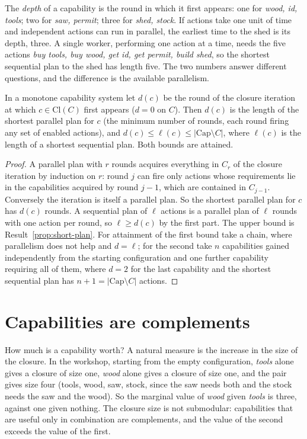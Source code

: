 The \emph{depth} of a capability is the round in which it first appears: one for \emph{wood, id, tools}; two for \emph{saw, permit}; three for \emph{shed, stock}. If actions take one unit of time and independent actions can run in parallel, the earliest time to the shed is its depth, three. A single worker, performing one action at a time, needs the five actions \emph{buy tools, buy wood, get id, get permit, build shed}, so the shortest sequential plan to the shed has length five. The two numbers answer different questions, and the difference is the available parallelism.

\begin{newresult}\label{prop:depth}
In a monotone capability system let $d(c)$ be the round of the closure iteration at which $c\in\mathrm{Cl}(C)$ first appears ($d=0$ on $C$). Then $d(c)$ is the length of the shortest parallel plan for $c$ (the minimum number of rounds, each round firing any set of enabled actions), and $d(c)\le\ell(c)\le|\mathrm{Cap}\setminus C|$, where $\ell(c)$ is the length of a shortest sequential plan. Both bounds are attained.
\end{newresult}
\begin{proof}
A parallel plan with $r$ rounds acquires everything in $C_r$ of the closure iteration by induction on $r$: round $j$ can fire only actions whose requirements lie in the capabilities acquired by round $j-1$, which are contained in $C_{j-1}$. Conversely the iteration is itself a parallel plan. So the shortest parallel plan for $c$ has $d(c)$ rounds. A sequential plan of $\ell$ actions is a parallel plan of $\ell$ rounds with one action per round, so $\ell\ge d(c)$ by the first part. The upper bound is Result~\ref{prop:short-plan}. For attainment of the first bound take a chain, where parallelism does not help and $d=\ell$; for the second take $n$ capabilities gained independently from the starting configuration and one further capability requiring all of them, where $d=2$ for the last capability and the shortest sequential plan has $n+1=|\mathrm{Cap}\setminus C|$ actions.
\end{proof}

\section{Capabilities are complements}\label{sec:complements}

How much is a capability worth? A natural measure is the increase in the size of the closure. In the workshop, starting from the empty configuration, \emph{tools} alone gives a closure of size one, \emph{wood} alone gives a closure of size one, and the pair gives size four (tools, wood, saw, stock, since the saw needs both and the stock needs the saw and the wood). So the marginal value of \emph{wood} given \emph{tools} is three, against one given nothing. The closure size is not submodular: capabilities that are useful only in combination are complements, and the value of the second exceeds the value of the first.

